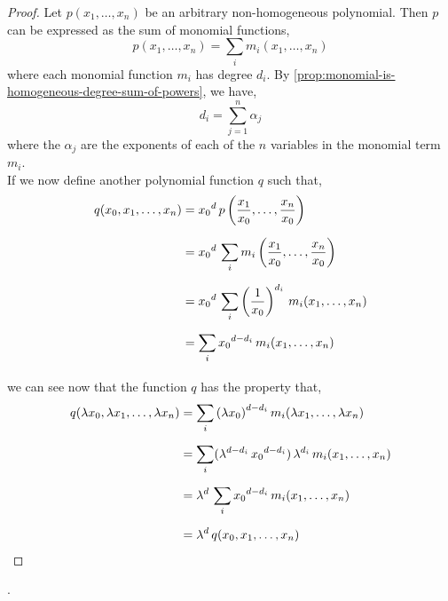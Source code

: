 \documentclass[../MathsNotesBase.tex]{subfiles}
\begin{document}
{		
	
		\bigskip
		\begin{tcolorbox}[breakable,enhanced jigsaw,colframe=white,colback=white,boxrule=0pt,arc=0pt,left=0pt,right=0pt,top=0pt,bottom=0pt]
			\begin{proof}
				Let ${ p(x_1,\dots,x_n) }$ be an arbitrary non-homogeneous polynomial. Then $p$ can be expressed as the sum of monomial functions,
				\[  p(x_1,\dots,x_n) = \sum_i m_i(x_1,\dots,x_n) \]
				where each monomial function $m_i$ has degree $d_i$. By \autoref{prop:monomial-is-homogeneous-degree-sum-of-powers}, we have,
				\[ d_i = \sum_{j=1}^n \alpha_j \]
				where the $\alpha_j$ are the exponents of each of the $n$ variables in the monomial term $m_i$.\\
				
				If we now define another polynomial function $q$ such that,
				\[\begin{aligned}
					q(x_0,x_1,\dots,x_n) &= {x_0}^d \, p\left(\frac{x_1}{x_0},\dots,\frac{x_n}{x_0}\right) \nn
					&= {x_0}^d \, \sum_i m_i\left(\frac{x_1}{x_0},\dots,\frac{x_n}{x_0}\right) \nn
					&= {x_0}^d \, \sum_i \left(\frac{1}{x_0}\right)^{d_i} \, m_i(x_1,\dots,x_n) \nn
					&= \sum_i {x_0}^{d-d_i} \, m_i(x_1,\dots,x_n) \nn
				\end{aligned}\]
				we can see now that the function $q$ has the property that,
				\[\begin{aligned}
					q(\lambda x_0,\lambda x_1,\dots,\lambda x_n) &= \sum_i {(\lambda x_0)}^{d-d_i} \, m_i(\lambda x_1,\dots,\lambda x_n) \nn
					&= \sum_i (\lambda^{d-d_i} \, {x_0}^{d-d_i}) \, \lambda^{d_i} \, m_i(x_1,\dots,x_n) \nn
					&= \lambda^d \, \sum_i {x_0}^{d-d_i} \, m_i(x_1,\dots,x_n) \nn
					&= \lambda^d \, q(x_0,x_1,\dots,x_n) \qedhere \\
				\end{aligned}\]
			\end{proof}.
		\end{tcolorbox}
	
		\biggerskip
}
\end{document}
